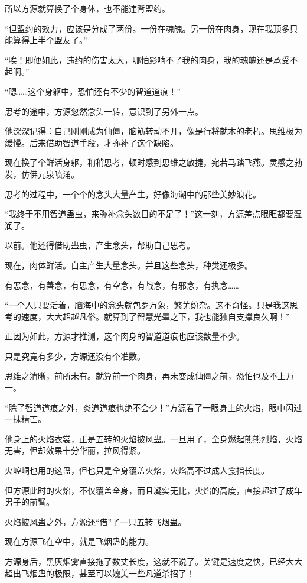 \begin{this_body}
所以方源就算换了个身体，也不能违背盟约。

“但盟约的效力，应该是分成了两份。一份在魂魄。另一份在肉身，现在我顶多只能算得上半个盟友了。”

“唉！即便如此，违约的伤害太大，哪怕影响不了我的肉身，我的魂魄还是承受不起啊。”

“嗯……这个身躯中，恐怕还有不少的智道道痕！”

思考的途中，方源忽然念头一转，意识到了另外一点。

他深深记得：自己刚刚成为仙僵，脑筋转动不开，像是行将就木的老朽。思维极为缓慢。后来借助智道手段，才弥补了这个缺陷。

现在换了个鲜活身躯，稍稍思考，顿时感到思维之敏捷，宛若马踏飞燕。灵感之勃发，仿佛元泉喷涌。

思考的过程中，一个个的念头大量产生，好像海潮中的那些美妙浪花。

“我终于不用智道蛊虫，来弥补念头数目的不足了！”这一刻，方源差点眼眶都要湿润了。

以前。他还得借助蛊虫，产生念头，帮助自己思考。

现在，肉体鲜活。自主产生大量念头。并且这些念头，种类还极多。

有恶念，有善念，有思念，有空念，有战念，有邪念，有执念……

“一个人只要活着，脑海中的念头就包罗万象，繁芜纷杂。这不奇怪。只是我这思考的速度，大大超越凡俗。就算到了智慧光晕之下，我也能独自支撑良久啊！”

正因为如此，方源才推测，这个肉身的智道道痕也应该数量不少。

只是究竟有多少，方源还没有个准数。

思维之清晰，前所未有。就算前一个肉身，再未变成仙僵之前，恐怕也及不上万一。

“除了智道道痕之外，炎道道痕也绝不会少！”方源看了一眼身上的火焰，眼中闪过一抹精芒。

他身上的火焰衣裳，正是五转的火焰披风蛊。一旦用了，全身燃起熊熊烈焰，火焰无害，但却效果十分华丽，拉风得紧。

火崆峒也用的这蛊，但也只是全身覆盖火焰，火焰高不过成人食指长度。

但方源此时的火焰，不仅覆盖全身，而且凝实无比，火焰的高度，直接超过了成年男子的前臂。

火焰披风蛊之外，方源还“借”了一只五转飞烟蛊。

现在方源飞在空中，就是飞烟蛊的能力。

方源身后，黑灰烟雾直接拖了数丈长度，这就不说了。关键是速度之快，已经大大超出飞烟蛊的极限，甚至可以媲美一些凡道杀招了！


\end{this_body}
